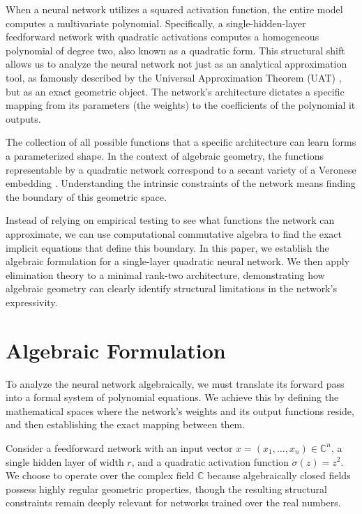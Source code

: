 \documentclass[12pt]{amsproc}
\renewcommand{\-}{\setminus}
\newcommand\<{\langle}
\renewcommand\>{\rangle}
\theoremstyle{plain}
\theoremstyle{definition}
\theoremstyle{remark}
\begin{document}
When a neural network utilizes a squared activation function, the entire model computes a multivariate polynomial. Specifically, a single-hidden-layer feedforward network with quadratic activations computes a homogeneous polynomial of degree two, also known as a quadratic form. This structural shift allows us to analyze the neural network not just as an analytical approximation tool, as famously described by the Universal Approximation Theorem (UAT) \cite{cybenko1989uat}, but as an exact geometric object. The network's architecture dictates a specific mapping from its parameters (the weights) to the coefficients of the polynomial it outputs. 

The collection of all possible functions that a specific architecture can learn forms a parameterized shape. In the context of algebraic geometry, the functions representable by a quadratic network correspond to a secant variety of a Veronese embedding \cite{landsberg2012tensors}. Understanding the intrinsic constraints of the network means finding the boundary of this geometric space. 

Instead of relying on empirical testing to see what functions the network can approximate, we can use computational commutative algebra to find the exact implicit equations that define this boundary. In this paper, we establish the algebraic formulation for a single-layer quadratic neural network. We then apply elimination theory \cite{cox2015IVA} to a minimal rank-two architecture, demonstrating how algebraic geometry can clearly identify structural limitations in the network's expressivity.

\section{Algebraic Formulation}

To analyze the neural network algebraically, we must translate its forward pass into a formal system of polynomial equations. We achieve this by defining the mathematical spaces where the network's weights and its output functions reside, and then establishing the exact mapping between them. 

Consider a feedforward network with an input vector $x = (x_1, \dots, x_n) \in \mathbb{C}^n$, a single hidden layer of width $r$, and a quadratic activation function $\sigma(z) = z^2$. We choose to operate over the complex field $\mathbb{C}$ because algebraically closed fields possess highly regular geometric properties, though the resulting structural constraints remain deeply relevant for networks trained over the real numbers. 
\end{document}
